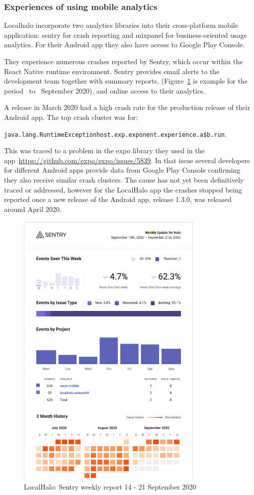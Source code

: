 \subsubsection{Experiences of using mobile analytics}
Localhalo incorporate two analytics libraries into their cross-platform mobile application: sentry for crash reporting and mixpanel for business-oriented usage analytics. For their Android app they also have access to Google Play Console.

They experience numerous crashes reported by Sentry, which occur within the React Native runtime environment. Sentry provides email alerts to the development team together with summary reports, (Figure~\ref{fig:localhalo-sentry-weekly-report-21-sep-2020} is example for the period~ to~ September 2020), and online access to their analytics.

A release in March 2020 had a high crash rate for the production release of their Android app. The top crash cluster was for:

\texttt{java.lang.RuntimeExceptionhost.exp.exponent.experience.a\$b.run}. 

This was traced to a problem in the expo library they used in the app~\url{https://github.com/expo/expo/issues/5839}. In that issue several developers for different Android apps provide data from Google Play Console confirming they also receive similar crash clusters. The cause has not yet been definitively traced or addressed, however for the LocalHalo app the crashes stopped being reported once a new release of the Android app, release 1.3.0, was released around  April 2020.

\begin{figure}[ht!]
    \centering
    \includegraphics[width=9cm]{images/localhalo/sentry-weekly-report-21-Sep-2020.png}
    \caption{LocalHalo: Sentry weekly report 14 - 21 September 2020}
    \label{fig:localhalo-sentry-weekly-report-21-sep-2020}
\end{figure}

